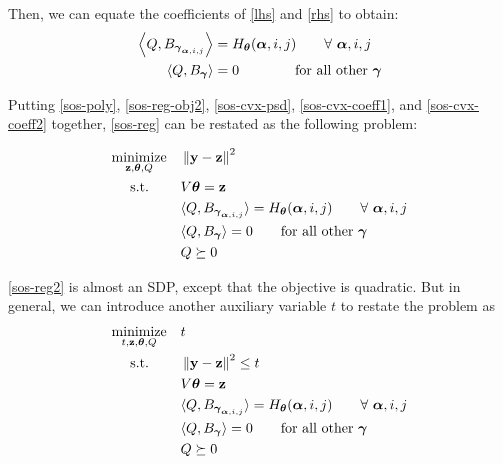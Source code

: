 \documentclass[11pt]{article}
\begin{document}
Then, we can equate the coefficients of \eqref{lhs} and \eqref{rhs} to obtain:
\begin{align}
\left\langle Q, B_{{\boldsymbol\gamma}_{{\boldsymbol\alpha}, i, j}} \right\rangle &= H_{\boldsymbol\theta}({\boldsymbol\alpha}, i, j) \qquad \forall\ {\boldsymbol\alpha}, i, j \label{sos-cvx-coeff1}\\
\left\langle Q, B_{{\boldsymbol\gamma}} \right\rangle &= 0 \qquad\qquad \text{for all other ${\boldsymbol\gamma}$} \label{sos-cvx-coeff2}
\end{align}

Putting \eqref{sos-poly}, \eqref{sos-reg-obj2}, \eqref{sos-cvx-psd}, \eqref{sos-cvx-coeff1}, and \eqref{sos-cvx-coeff2} together, \eqref{sos-reg} can be restated as the following problem:

\begin{equation}\label{sos-reg2}
\begin{aligned}
& \underset{{\bf z}, {\boldsymbol\theta}, Q}{\text{minimize}}
& & \left\lVert {\bf y}-{\bf z} \right\rVert^2 \\
& \text{\quad\ s.t.}
& & V{\boldsymbol\theta} = {\bf z} \\
& & & \langle{Q, B_{{\boldsymbol\gamma}_{{\boldsymbol\alpha}, i, j}}\rangle} = H_{\boldsymbol\theta}({\boldsymbol\alpha}, i, j) \qquad \forall\ {\boldsymbol\alpha}, i, j \\
& & & \langle{Q, B_{{\boldsymbol\gamma}}\rangle} = 0 \qquad \text{for all other ${\boldsymbol\gamma}$} \\
& & & Q \succeq 0 
\end{aligned}
\end{equation}

\eqref{sos-reg2} is almost an SDP, except that the objective is quadratic. But in general, we can introduce another auxiliary variable $t$ to restate the problem as
\begin{equation}\label{sos-reg3}
\begin{aligned}
& \underset{t, {\bf z}, {\boldsymbol\theta}, Q}{\text{minimize}}
& & t \\
& \text{\quad\ s.t.}
& & \left\lVert {\bf y}-{\bf z} \right\rVert^2 \leq t \\
& & & V{\boldsymbol\theta} = {\bf z} \\
& & & \langle{Q, B_{{\boldsymbol\gamma}_{{\boldsymbol\alpha}, i, j}}\rangle} = H_{\boldsymbol\theta}({\boldsymbol\alpha}, i, j) \qquad \forall\ {\boldsymbol\alpha}, i, j \\
& & & \langle{Q, B_{{\boldsymbol\gamma}}\rangle} = 0 \qquad \text{for all other ${\boldsymbol\gamma}$} \\
& & & Q \succeq 0 
\end{aligned}
\end{equation}
\end{document}

